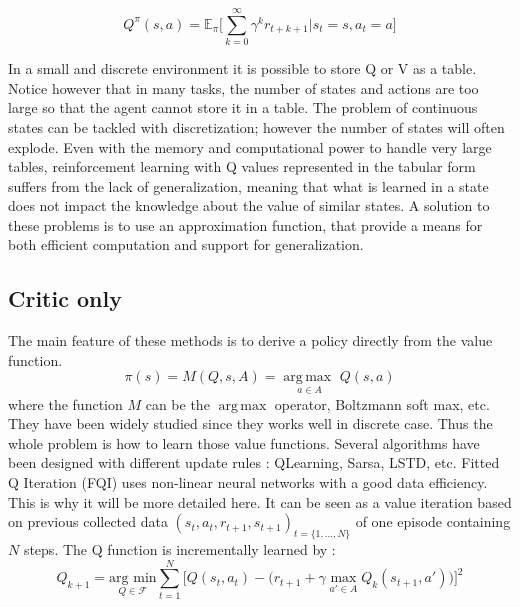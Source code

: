 \begin{equation}
  Q^\pi(s, a) = \mathbb{E}_\pi \Big[ \sum_{k=0}^{\infty} \gamma^k r_{t+k+1} \Big| s_t = s, a_t = a \Big]
\end{equation}

In a small and discrete environment it is possible to store Q or V as a table.
Notice however that in many tasks, the number of states and actions are
too large so that the agent cannot store it in a table. The problem of
continuous states can be tackled with discretization; however the number of
states will often explode. Even with the memory and computational power to
handle very large tables, reinforcement learning with Q values represented in the
tabular form suffers from the lack of generalization, meaning that what is learned
in a state does not impact the knowledge about the value of similar states.
A solution to these problems is to use an approximation function, that provide
a means for both efficient computation and support for generalization.


% 



\subsection{Critic only}
The main feature of these methods is to derive a policy directly from the value function.
\begin{equation}
 \pi(s) = M(Q, s, A) = \underset{a \in A}{\operatorname{arg\,max\ }} Q(s,a)
\end{equation}
where the function $M$ can be the $\operatorname{arg\,max}$ operator, Boltzmann soft max, etc.
They have been widely studied since they works well in discrete case.
Thus the whole problem is how to learn those value functions.
Several algorithms have been designed with different update rules : QLearning, Sarsa, LSTD, etc.
Fitted Q Iteration (FQI) \cite{Riedmiller2005} uses non-linear neural networks with a good data efficiency.
This is why it will be more detailed here.
It can be seen as a value iteration based on previous collected data $(s_t, a_t,r_{t+1}, s_{t+1})_{t=\{1,...,N\}}$ of one episode containing $N$ steps.
The Q function is incrementally learned by : 
\begin{equation}
 Q_{k+1} = \underset{Q \in \mathcal{F}}{\text{arg min}} \sum_{t=1}^{N} \Big[ Q(s_t, a_t) - \big( r_{t+1} + \gamma \underset{a' \in A}{\text{ max }} Q_k(s_{t+1}, a') \big) \Big]^2
\end{equation}

